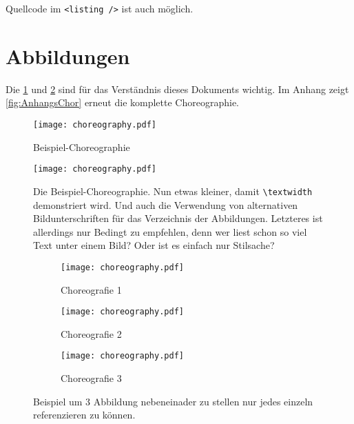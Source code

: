 

Quellcode im \lstinline|<listing />| ist auch möglich.

\section{Abbildungen}

Die \cref{fig:chor1} und \ref{fig:chor2} sind für das Verständnis dieses Dokuments wichtig.
Im Anhang zeigt \vref{fig:AnhangsChor} erneut die komplette Choreographie.

\begin{figure}
  \centering
  \texttt{[image: choreography.pdf]}
  \caption{Beispiel-Choreographie}
  \label{fig:chor1}
\end{figure}

\begin{figure}
  \centering
  \texttt{[image: choreography.pdf]}
  \caption[Beispiel-Choreographie]{Die Beispiel-Choreographie.
    Nun etwas kleiner, damit \texttt{\textbackslash textwidth} demonstriert wird.
    Und auch die Verwendung von alternativen Bildunterschriften für das Verzeichnis der Abbildungen.
    Letzteres ist allerdings nur Bedingt zu empfehlen, denn wer liest schon so viel Text unter einem Bild?
    Oder ist es einfach nur Stilsache?
  }
  \label{fig:chor2}
\end{figure}


\begin{figure}
  \hfill
  \begin{subfigure}{.3\textwidth}
    \texttt{[image: choreography.pdf]}
    \caption{Choreografie 1}
    \label{fig:subfigA}
  \end{subfigure}
  \hfill
  \begin{subfigure}{.3\textwidth}
    \texttt{[image: choreography.pdf]}
    \caption{Choreografie 2}
    \label{fig:subfigB}
  \end{subfigure}
  \hfill
  \begin{subfigure}{.3\textwidth}
    \texttt{[image: choreography.pdf]}
    \caption{Choreografie 3}
    \label{fig:subfigC}
  \end{subfigure}
  \caption{Beispiel um 3 Abbildung nebeneinader zu stellen nur jedes einzeln referenzieren zu können.}
  \label{fig:subfig_example}
\end{figure}

